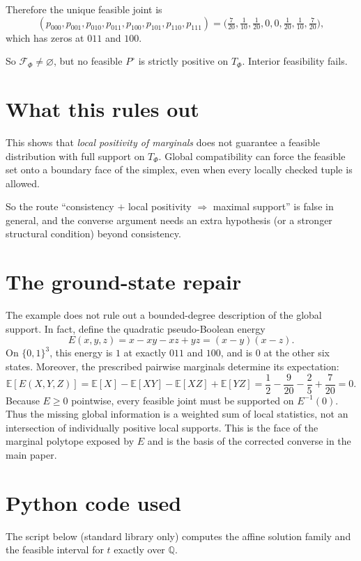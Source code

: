 \documentclass{article}
\begin{document}
Therefore the unique feasible joint is
\[
(p_{000},p_{001},p_{010},p_{011},p_{100},p_{101},p_{110},p_{111})
=\Big(\tfrac{7}{20},\tfrac{1}{10},\tfrac{1}{20},0,0,\tfrac{1}{20},\tfrac{1}{10},\tfrac{7}{20}\Big),
\]
which has zeros at \(011\) and \(100\).

So \(\mathcal{F}_\Phi\neq\varnothing\), but no feasible \(P^\circ\) is strictly positive on \(T_\Phi\). Interior feasibility fails.

\section*{What this rules out}
This shows that \emph{local positivity of marginals} does not guarantee a feasible distribution with full support on \(T_\Phi\). Global compatibility can force the feasible set onto a boundary face of the simplex, even when every locally checked tuple is allowed.

So the route ``consistency \(+\) local positivity \(\Rightarrow\) maximal support'' is false in general, and the converse argument needs an extra hypothesis (or a stronger structural condition) beyond consistency.

\section*{The ground-state repair}
The example does not rule out a bounded-degree description of the global support.
In fact, define the quadratic pseudo-Boolean energy
\[
E(x,y,z)=x-xy-xz+yz=(x-y)(x-z).
\]
On \(\{0,1\}^3\), this energy is \(1\) at exactly \(011\) and \(100\), and is
\(0\) at the other six states.  Moreover, the prescribed pairwise marginals
determine its expectation:
\[
\mathbb E[E(X,Y,Z)]
=\mathbb E[X]-\mathbb E[XY]-\mathbb E[XZ]+\mathbb E[YZ]
=\frac12-\frac9{20}-\frac25+\frac7{20}=0.
\]
Because \(E\ge0\) pointwise, every feasible joint must be supported on
\(E^{-1}(0)\).  Thus the missing global information is a weighted sum of local
statistics, not an intersection of individually positive local supports.  This
is the face of the marginal polytope exposed by \(E\) and is the basis of the
corrected converse in the main paper.

\section*{Python code used}
The script below (standard library only) computes the affine solution family and the feasible interval for \(t\) exactly over \(\mathbb{Q}\).
\end{document}
